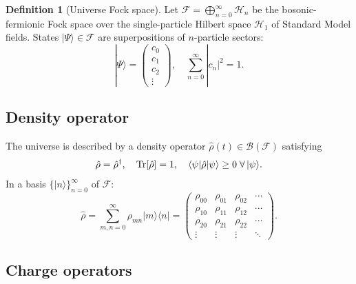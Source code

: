 \documentclass[12pt,a4paper]{article}
\theoremstyle{definition}
\newtheorem{definition}[theorem]{Definition}
\theoremstyle{remark}
\newcommand{\rhohat}{\hat{\rho}}
\newcommand{\Fock}{\mathcal{F}}
\newcommand{\Hilb}{\mathcal{H}}
\begin{document}
\begin{definition}[Universe Fock space]
Let $\Fock = \bigoplus_{n=0}^{\infty}\Hilb_n$ be the bosonic-fermionic
Fock space over the single-particle Hilbert space $\Hilb_1$ of Standard
Model fields.
States $|\Psi\rangle \in \Fock$ are superpositions of $n$-particle sectors:
\begin{equation}
  |\Psi\rangle
  = \begin{pmatrix} c_0 \\ c_1 \\ c_2 \\ \vdots \end{pmatrix},
  \quad
  \sum_{n=0}^\infty |c_n|^2 = 1.
\end{equation}
\end{definition}

\subsection{Density operator}

The universe is described by a density operator
$\rhohat(t) \in \mathcal{B}(\Fock)$ satisfying
\begin{equation}\label{eq:rho_props}
  \rhohat = \rhohat^\dagger,
  \quad
  \Tr[\rhohat] = 1,
  \quad
  \langle\psi|\rhohat|\psi\rangle \geq 0 \;\forall\,|\psi\rangle.
\end{equation}
In a basis $\{|n\rangle\}_{n=0}^\infty$ of $\Fock$:
\begin{equation}\label{eq:rho_matrix}
  \rhohat = \sum_{m,n=0}^\infty \rho_{mn}|m\rangle\langle n|
  = \begin{pmatrix}
    \rho_{00} & \rho_{01} & \rho_{02} & \cdots \\
    \rho_{10} & \rho_{11} & \rho_{12} & \cdots \\
    \rho_{20} & \rho_{21} & \rho_{22} & \cdots \\
    \vdots & \vdots & \vdots & \ddots
  \end{pmatrix}.
\end{equation}

\subsection{Charge operators}
\end{document}
